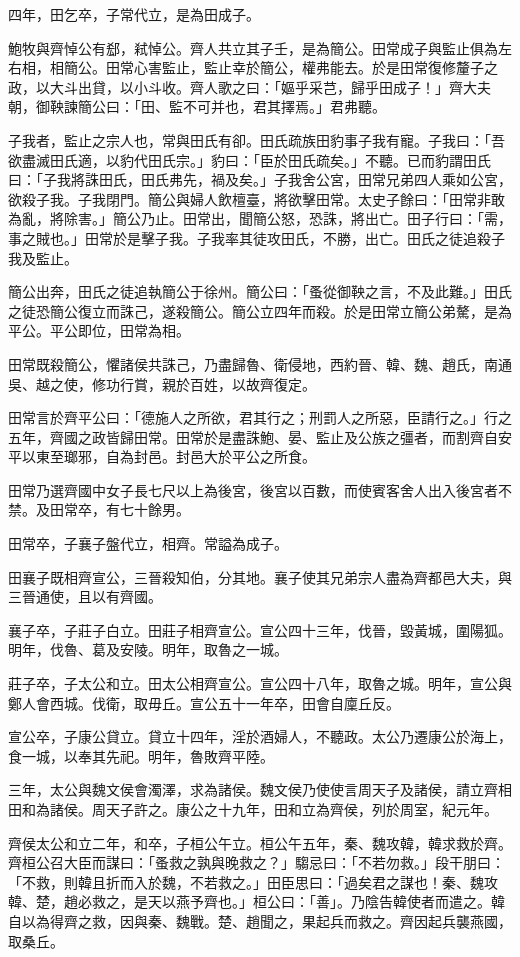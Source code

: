 \begin{pinyinscope}
四年，田乞卒，子常代立，是為田成子。

鮑牧與齊悼公有郄，弒悼公。齊人共立其子壬，是為簡公。田常成子與監止俱為左右相，相簡公。田常心害監止，監止幸於簡公，權弗能去。於是田常復修釐子之政，以大斗出貸，以小斗收。齊人歌之曰：「嫗乎采芑，歸乎田成子！」齊大夫朝，御鞅諫簡公曰：「田、監不可并也，君其擇焉。」君弗聽。

子我者，監止之宗人也，常與田氏有卻。田氏疏族田豹事子我有寵。子我曰：「吾欲盡滅田氏適，以豹代田氏宗。」豹曰：「臣於田氏疏矣。」不聽。已而豹謂田氏曰：「子我將誅田氏，田氏弗先，禍及矣。」子我舍公宮，田常兄弟四人乘如公宮，欲殺子我。子我閉門。簡公與婦人飲檀臺，將欲擊田常。太史子餘曰：「田常非敢為亂，將除害。」簡公乃止。田常出，聞簡公怒，恐誅，將出亡。田子行曰：「需，事之賊也。」田常於是擊子我。子我率其徒攻田氏，不勝，出亡。田氏之徒追殺子我及監止。

簡公出奔，田氏之徒追執簡公于徐州。簡公曰：「蚤從御鞅之言，不及此難。」田氏之徒恐簡公復立而誅己，遂殺簡公。簡公立四年而殺。於是田常立簡公弟驁，是為平公。平公即位，田常為相。

田常既殺簡公，懼諸侯共誅己，乃盡歸魯、衛侵地，西約晉、韓、魏、趙氏，南通吳、越之使，修功行賞，親於百姓，以故齊復定。

田常言於齊平公曰：「德施人之所欲，君其行之；刑罰人之所惡，臣請行之。」行之五年，齊國之政皆歸田常。田常於是盡誅鮑、晏、監止及公族之彊者，而割齊自安平以東至瑯邪，自為封邑。封邑大於平公之所食。

田常乃選齊國中女子長七尺以上為後宮，後宮以百數，而使賓客舍人出入後宮者不禁。及田常卒，有七十餘男。

田常卒，子襄子盤代立，相齊。常謚為成子。

田襄子既相齊宣公，三晉殺知伯，分其地。襄子使其兄弟宗人盡為齊都邑大夫，與三晉通使，且以有齊國。

襄子卒，子莊子白立。田莊子相齊宣公。宣公四十三年，伐晉，毀黃城，圍陽狐。明年，伐魯、葛及安陵。明年，取魯之一城。

莊子卒，子太公和立。田太公相齊宣公。宣公四十八年，取魯之城。明年，宣公與鄭人會西城。伐衛，取毋丘。宣公五十一年卒，田會自廩丘反。

宣公卒，子康公貸立。貸立十四年，淫於酒婦人，不聽政。太公乃遷康公於海上，食一城，以奉其先祀。明年，魯敗齊平陸。

三年，太公與魏文侯會濁澤，求為諸侯。魏文侯乃使使言周天子及諸侯，請立齊相田和為諸侯。周天子許之。康公之十九年，田和立為齊侯，列於周室，紀元年。

齊侯太公和立二年，和卒，子桓公午立。桓公午五年，秦、魏攻韓，韓求救於齊。齊桓公召大臣而謀曰：「蚤救之孰與晚救之？」騶忌曰：「不若勿救。」段干朋曰：「不救，則韓且折而入於魏，不若救之。」田臣思曰：「過矣君之謀也！秦、魏攻韓、楚，趙必救之，是天以燕予齊也。」桓公曰：「善」。乃陰告韓使者而遣之。韓自以為得齊之救，因與秦、魏戰。楚、趙聞之，果起兵而救之。齊因起兵襲燕國，取桑丘。


\end{pinyinscope}
